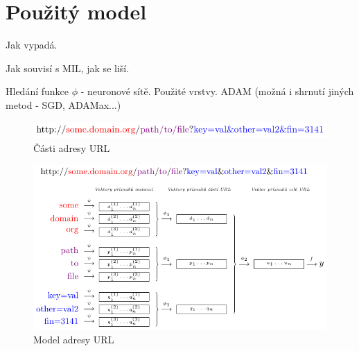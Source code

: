 \chapter{Použitý model}

Jak vypadá.

Jak souvisí s MIL, jak se liší.

Hledání funkce \( \phi \) - neuronové sítě. Použité vrstvy. ADAM (možná i shrnutí jiných metod - SGD, ADAMax...)

\begin{figure}
	\caption{Části adresy URL}\label{url_parts}
	\centering
	\includegraphics{images/url/url.pdf}
\end{figure}

\begin{figure}
	\caption{Model adresy URL}\label{url_model}
	\centering
	\includegraphics{images/model/model.pdf}
\end{figure}

